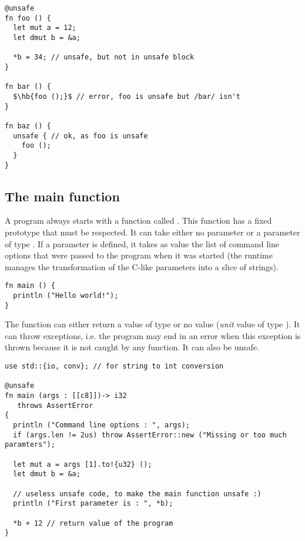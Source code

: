 \begin{lstlisting}[style=coloredverbatim, escapechar=$]
@unsafe
fn foo () {
  let mut a = 12;
  let dmut b = &a;

  *b = 34; // unsafe, but not in unsafe block
}

fn bar () {
  $\hb{foo ();}$ // error, foo is unsafe but /bar/ isn't
}

fn baz () {
  unsafe { // ok, as foo is unsafe
    foo ();
  }
}
\end{lstlisting}

\subsection{The main function}

A program always starts with a function called . This function has
a fixed prototype that must be respected. It can take either no parameter or a
parameter of type \token{[[c8]]}. If a parameter is defined, it takes as value
the list of command line options that were passed to the program when it was
started (the runtime manages the transformation of the C-like parameters
 into a slice of strings).

\begin{lstlisting}[style=coloredverbatim, caption=The simplest main function prototype]
fn main () {
  println ("Hello world!");
}
\end{lstlisting}

The function can either return a value of type  or no value
(\textit{unit} value of type ). It can throw exceptions, i.e. the
program may end in an error when this exception is thrown because it is not
caught by any function. It can also be unsafe.

\begin{lstlisting}[style=coloredverbatim, caption=The most complex main function prototype]
use std::{io, conv}; // for string to int conversion

@unsafe
fn main (args : [[c8]])-> i32
   throws AssertError
{
  println ("Command line options : ", args);
  if (args.len != 2us) throw AssertError::new ("Missing or too much paramters");

  let mut a = args [1].to!{u32} ();
  let dmut b = &a;

  // useless unsafe code, to make the main function unsafe :)
  println ("First parameter is : ", *b);

  *b + 12 // return value of the program
}
\end{lstlisting}

